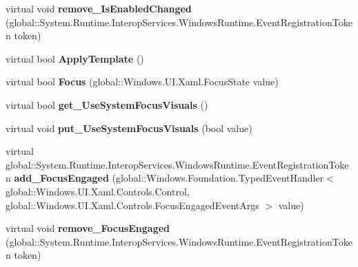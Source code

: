 \begin{DoxyCompactItemize}
\item 
\mbox{\label{class_windows_1_1_u_i_1_1_xaml_1_1_controls_1_1_control_ae6492dba1a06b7283e52b7e05df6ba01}} 
virtual void {\bfseries remove\+\_\+\+Is\+Enabled\+Changed} (global\+::\+System.\+Runtime.\+Interop\+Services.\+Windows\+Runtime.\+Event\+Registration\+Token token)
\item 
\mbox{\label{class_windows_1_1_u_i_1_1_xaml_1_1_controls_1_1_control_acdc49d1356465906f233a94118f9fc61}} 
virtual bool {\bfseries Apply\+Template} ()
\item 
\mbox{\label{class_windows_1_1_u_i_1_1_xaml_1_1_controls_1_1_control_af09f0101a93f914e3ea713e2afd6cbc5}} 
virtual bool {\bfseries Focus} (global\+::\+Windows.\+U\+I.\+Xaml.\+Focus\+State value)
\item 
\mbox{\label{class_windows_1_1_u_i_1_1_xaml_1_1_controls_1_1_control_a1f599dcf33ab7480ed9700961d478ab9}} 
virtual bool {\bfseries get\+\_\+\+Use\+System\+Focus\+Visuals} ()
\item 
\mbox{\label{class_windows_1_1_u_i_1_1_xaml_1_1_controls_1_1_control_a47ca9e1b055dc27a0c37edbc47e2540d}} 
virtual void {\bfseries put\+\_\+\+Use\+System\+Focus\+Visuals} (bool value)
\item 
\mbox{\label{class_windows_1_1_u_i_1_1_xaml_1_1_controls_1_1_control_a25b5c6642d47212aa2e63ff6200ac1c7}} 
virtual global\+::\+System.\+Runtime.\+Interop\+Services.\+Windows\+Runtime.\+Event\+Registration\+Token {\bfseries add\+\_\+\+Focus\+Engaged} (global\+::\+Windows.\+Foundation.\+Typed\+Event\+Handler$<$ global\+::\+Windows.\+U\+I.\+Xaml.\+Controls.\+Control, global\+::\+Windows.\+U\+I.\+Xaml.\+Controls.\+Focus\+Engaged\+Event\+Args $>$ value)
\item 
\mbox{\label{class_windows_1_1_u_i_1_1_xaml_1_1_controls_1_1_control_aae2dfe22e085e480a19bdb599b17d9bb}} 
virtual void {\bfseries remove\+\_\+\+Focus\+Engaged} (global\+::\+System.\+Runtime.\+Interop\+Services.\+Windows\+Runtime.\+Event\+Registration\+Token token)

\end{DoxyCompactItemize}
